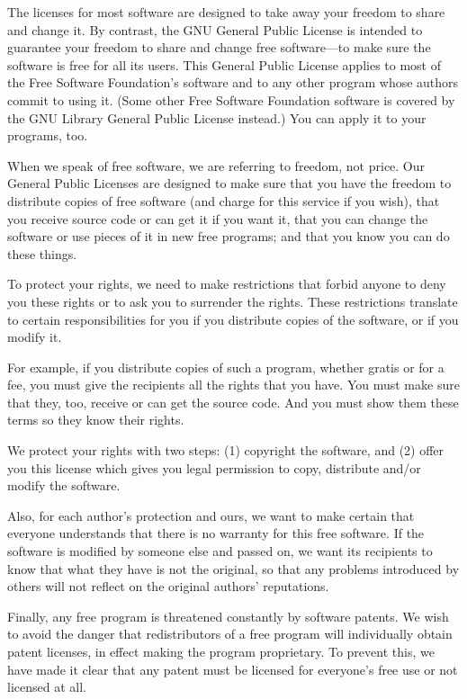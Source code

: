 \documentclass[%
	11pt,
        a4paper,
        twoside]{workrep}
\newcommand{\dash}{---}
\begin{document}
The licenses for most software are designed to take away your
freedom to share and change it.  By contrast, the GNU General Public
License is intended to guarantee your freedom to share and change free
software\dash to make sure the software is free for all its users.  This
General Public License applies to most of the Free Software
Foundation's software and to any other program whose authors commit to
using it.  (Some other Free Software Foundation software is covered by
the GNU Library General Public License instead.)  You can apply it to
your programs, too.

  When we speak of free software, we are referring to freedom, not
price.  Our General Public Licenses are designed to make sure that you
have the freedom to distribute copies of free software (and charge for
this service if you wish), that you receive source code or can get it
if you want it, that you can change the software or use pieces of it
in new free programs; and that you know you can do these things.

  To protect your rights, we need to make restrictions that forbid
anyone to deny you these rights or to ask you to surrender the rights.
These restrictions translate to certain responsibilities for you if you
distribute copies of the software, or if you modify it.

  For example, if you distribute copies of such a program, whether
gratis or for a fee, you must give the recipients all the rights that
you have.  You must make sure that they, too, receive or can get the
source code.  And you must show them these terms so they know their
rights.

  We protect your rights with two steps: (1) copyright the software, and
(2) offer you this license which gives you legal permission to copy,
distribute and/or modify the software.

  Also, for each author's protection and ours, we want to make certain
that everyone understands that there is no warranty for this free
software.  If the software is modified by someone else and passed on, we
want its recipients to know that what they have is not the original, so
that any problems introduced by others will not reflect on the original
authors' reputations.

  Finally, any free program is threatened constantly by software
patents.  We wish to avoid the danger that redistributors of a free
program will individually obtain patent licenses, in effect making the
program proprietary.  To prevent this, we have made it clear that any
patent must be licensed for everyone's free use or not licensed at all.
\end{document}
